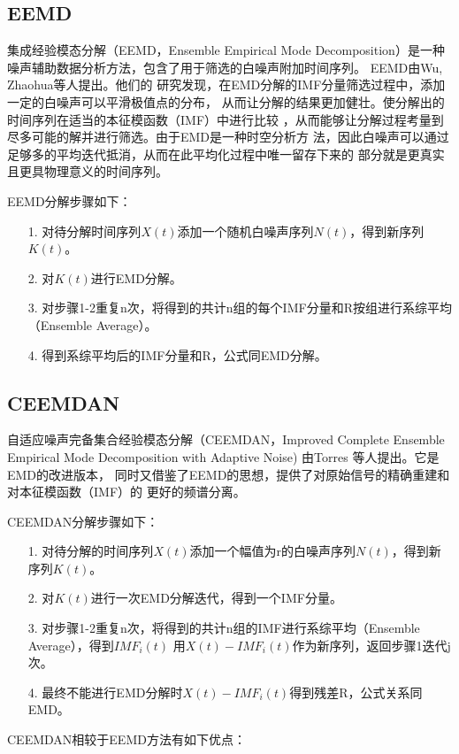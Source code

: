 \documentclass[AutoFakeBold]{LZUThesis}
\begin{document}
\subsection{EEMD}

集成经验模态分解（EEMD，Ensemble Empirical Mode Decomposition）是一种
噪声辅助数据分析方法，包含了用于筛选的白噪声附加时间序列。
EEMD由Wu, Zhaohua等人提出\cite{wu2009ensemble}。他们的
研究发现，在EMD分解的IMF分量筛选过程中，添加一定的白噪声可以平滑极值点的分布，
从而让分解的结果更加健壮。使分解出的时间序列在适当的本征模函数（IMF）中进行比较
，从而能够让分解过程考量到尽多可能的解并进行筛选。由于EMD是一种时空分析方
法，因此白噪声可以通过足够多的平均迭代抵消，从而在此平均化过程中唯一留存下来的
部分就是更真实且更具物理意义的时间序列。

EEMD分解步骤如下：
\begin{itemize}
\item[1. ] 对待分解时间序列$X(t)$添加一个随机白噪声序列$N(t)$，得到新序列$K(t)$。
\item[2. ] 对$K(t)$进行EMD分解。
\item[3. ] 对步骤1-2重复n次，将得到的共计n组的每个IMF分量和R按组进行系综平均（Ensemble Average）。
\item[4. ] 得到系综平均后的IMF分量和R，公式同EMD分解。
\end{itemize}

\subsection{CEEMDAN}
自适应噪声完备集合经验模态分解（CEEMDAN，Improved Complete Ensemble
Empirical Mode Decomposition with Adaptive Noise) 由Torres
等人提出\cite{torres2011complete}。它是EMD的改进版本，
同时又借鉴了EEMD的思想，提供了对原始信号的精确重建和对本征模函数（IMF）的
更好的频谱分离。

CEEMDAN分解步骤如下：
\begin{itemize}
\item[1. ] 对待分解的时间序列$X(t)$添加一个幅值为r的白噪声序列$N(t)$，得到新序列$K(t)$。
\item[2. ] 对$K(t)$进行一次EMD分解迭代，得到一个IMF分量。
\item[3. ] 对步骤1-2重复n次，将得到的共计n组的IMF进行系综平均（Ensemble Average），得到$IMF_i(t)$
用$X(t)-IMF_i(t)$作为新序列，返回步骤1迭代j次。
\item[4. ] 最终不能进行EMD分解时$X(t)-IMF_i(t)$得到残差R，公式关系同EMD。
\end{itemize}

CEEMDAN相较于EEMD方法有如下优点：
\end{document}
